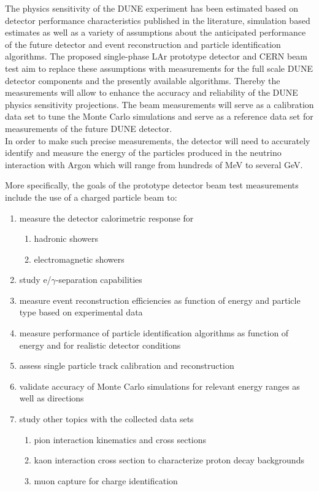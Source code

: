 The physics sensitivity of the DUNE experiment has been estimated based on detector performance characteristics published in the literature, simulation based estimates as well as a variety of assumptions about the anticipated performance of the future detector and event reconstruction and particle identification algorithms.
The proposed single-phase LAr prototype detector and CERN beam test aim to replace these assumptions with measurements for the full scale DUNE detector components and the presently available algorithms. Thereby the measurements will allow to enhance the accuracy and reliability of the DUNE physics sensitivity projections.
The beam measurements will serve as a calibration data set to tune the Monte Carlo simulations and serve as a reference data set for measurements of the future DUNE detector. \\
%
In order to make such precise measurements, the detector will need to accurately identify and measure the energy of the particles produced in the neutrino interaction with Argon which will range from hundreds of MeV to several GeV.

More specifically, the goals of the prototype detector beam test measurements include
the use of a charged particle beam to:
\begin{enumerate}
\item measure the detector calorimetric response for
\begin{enumerate}
	\item hadronic showers
	\item electromagnetic showers
\end{enumerate}
\item study e/$\gamma$-separation capabilities
\item measure event reconstruction efficiencies as function of energy and particle type based on experimental data
\item measure performance of particle identification algorithms as function of energy and for realistic detector conditions
\item assess single particle track calibration and reconstruction
\item validate accuracy of Monte Carlo simulations for relevant energy ranges as well as directions

\item study other topics with the collected data sets
 \begin{enumerate}
    \item pion interaction kinematics and cross sections
    \item kaon interaction cross section to characterize proton decay backgrounds
    \item muon capture for charge identification
 \end{enumerate}
\end{enumerate}

